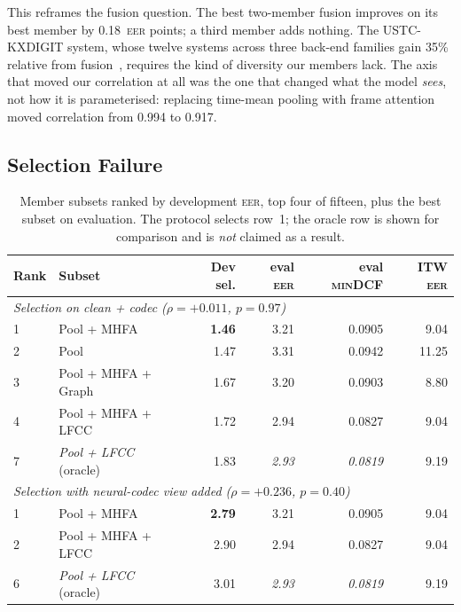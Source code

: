 \documentclass{llncs}
\newcommand{\eer}{\textsc{eer}}
\newcommand{\mindcf}{\textsc{minDCF}}
\newcommand{\best}[1]{\textbf{#1}}
\begin{document}
This reframes the fusion question.  The best two-member fusion improves on its best
member by 0.18~\eer{} points; a third member adds nothing.  The USTC-KXDIGIT system,
whose twelve systems across three back-end families gain 35\% relative from
fusion~\cite{ustc2024}, requires the kind of diversity our members lack.  The axis
that moved our correlation at all was the one that changed what the model
\emph{sees}, not how it is parameterised: replacing time-mean pooling with frame
attention moved correlation from 0.994 to 0.917.

\subsection{Selection Failure}
\label{sec:selection}

\begin{table}[t]
\centering
\small
\caption{Member subsets ranked by development \eer{}, top four of fifteen, plus
the best subset on evaluation.  The protocol selects row~1; the oracle row is
shown for comparison and is \emph{not} claimed as a result.}
\label{tab:selection}
\begin{tabular}{llrrrr}
\toprule
Rank & Subset & Dev sel. & eval \eer{} & eval \mindcf{} & ITW \eer{} \\
\midrule
\multicolumn{6}{l}{\emph{Selection on clean + codec ($\rho{=}+0.011$, $p{=}0.97$)}}\\
1 & Pool + MHFA          & \best{1.46} & 3.21 & 0.0905 & 9.04 \\
2 & Pool                 & 1.47 & 3.31 & 0.0942 & 11.25 \\
3 & Pool + MHFA + Graph  & 1.67 & 3.20 & 0.0903 & 8.80 \\
4 & Pool + MHFA + LFCC   & 1.72 & 2.94 & 0.0827 & 9.04 \\
7 & \emph{Pool + LFCC} (oracle) & 1.83 & \emph{2.93} & \emph{0.0819} & 9.19 \\
\midrule
\multicolumn{6}{l}{\emph{Selection with neural-codec view added ($\rho{=}+0.236$, $p{=}0.40$)}}\\
1 & Pool + MHFA          & \best{2.79} & 3.21 & 0.0905 & 9.04 \\
2 & Pool + MHFA + LFCC   & 2.90 & 2.94 & 0.0827 & 9.04 \\
6 & \emph{Pool + LFCC} (oracle) & 3.01 & \emph{2.93} & \emph{0.0819} & 9.19 \\
\bottomrule
\end{tabular}
\end{table}
\end{document}
